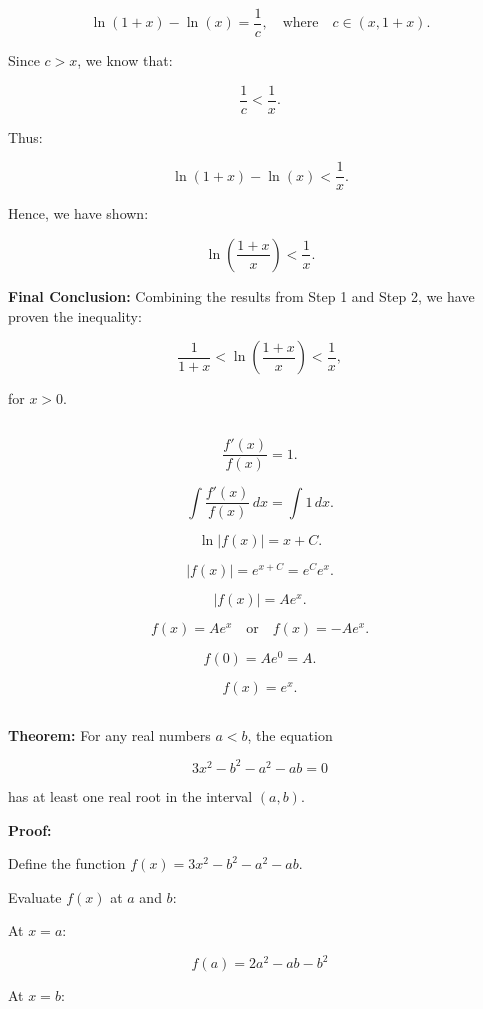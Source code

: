 \documentclass{article}
\begin{document}
\[
\ln(1+x) - \ln(x) = \frac{1}{c}, \quad \text{where} \quad c \in (x, 1+x).
\]

Since \( c > x \), we know that:

\[
\frac{1}{c} < \frac{1}{x}.
\]

Thus:

\[
\ln(1+x) - \ln(x) < \frac{1}{x}.
\]

Hence, we have shown:

\[
\ln\left(\frac{1+x}{x}\right) < \frac{1}{x}.
\]

\textbf{Final Conclusion:}
Combining the results from Step 1 and Step 2, we have proven the inequality:

\[
\frac{1}{1+x} < \ln\left(\frac{1+x}{x}\right) < \frac{1}{x},
\]

for \( x > 0 \).


\subsection{}


\[
\frac{f'(x)}{f(x)} = 1.
\]


\[
\int \frac{f'(x)}{f(x)} \, dx = \int 1 \, dx.
\]


\[
\ln |f(x)| = x + C.
\]


\[
|f(x)| = e^{x+C} = e^C e^x.
\]


\[
|f(x)| = A e^x.
\]


\[
f(x) = A e^x \quad \text{or} \quad f(x) = -A e^x.
\]



\[
f(0) = A e^0 = A.
\]


\[
f(x) = e^x.
\]

\subsection{}


	\textbf{Theorem:} For any real numbers \( a < b \), the equation 
	
	\[
	3x^2 - b^2 - a^2 - ab = 0
	\]
	
	has at least one real root in the interval \( (a, b) \).
	
	\textbf{Proof:}
	
	Define the function \( f(x) = 3x^2 - b^2 - a^2 - ab \).
	
	Evaluate \( f(x) \) at \( a \) and \( b \):
	
	At \( x = a \):
	
	\[
	f(a) = 2a^2 - ab - b^2
	\]
	
	At \( x = b \):
	
\end{document}
